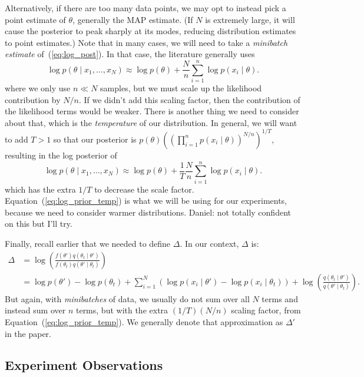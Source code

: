 \documentclass{article}
\begin{document}
Alternatively, if there are too many data points, we may opt to instead pick a point estimate of
$\theta$, generally the MAP estimate. (If $N$ is extremely large, it will cause the posterior to
peak sharply at its modes, reducing distribution estimates to point estimates.) Note that in many
cases, we will need to take a \emph{minibatch estimate} of~(\ref{eq:log_post}). In that case, the
literature generally uses
\begin{equation}\label{eq:scaling_factor}
\log p(\theta \mid x_1,\ldots,x_N) \approx \log p(\theta) + \frac{N}{n} \sum_{i=1}^n\log p(x_i \mid \theta).
\end{equation}
where we only use $n \ll N$ samples, but we must scale up the likelihood contribution by $N/n$. If we
didn't add this scaling factor, then the contribution of the likelihood terms would be weaker. There
is another thing we need to consider about that, which is the \emph{temperature} of our
distribution. In general, we will want to add $T > 1$ so that our posterior is
$p(\theta)((\prod_{i=1}^n p(x_i\mid \theta))^{N/n})^{1/T}$, resulting in the log
posterior of 
\begin{equation}\label{eq:log_prior_temp}
\log p(\theta \mid x_1,\ldots,x_N) \approx \log p(\theta) + \frac{1}{T}\frac{N}{n} \sum_{i=1}^n\log p(x_i \mid \theta).
\end{equation}
which has the extra $1/T$ to decrease the scale factor.  Equation~(\ref{eq:log_prior_temp}) is what
we will be using for our experiments, because we need to consider warmer distributions.
{\color{blue} Daniel: not totally confident on this but I'll try.}

Finally, recall earlier that we needed to define $\Delta$. In our context, $\Delta$ is:
\begin{align}
\Delta &= \log \left(\frac{f(\theta') q(\theta_t \mid \theta')}{f(\theta_t) q(\theta'\mid \theta_t)} \right) \\
&= \log p(\theta') - \log p(\theta_t) + \sum_{i=1}^N(\log p(x_i \mid \theta') - \log p(x_i \mid \theta_t)) + \log\left(\frac{q(\theta_t \mid \theta')}{q(\theta' \mid \theta_t)}\right).
\end{align}
But again, with \emph{minibatches} of data, we usually do not sum over all $N$ terms and instead sum
over $n$ terms, but with the extra $(1/T)(N/n)$ scaling factor, from
Equation~(\ref{eq:log_prior_temp}). We generally denote that approximation as $\Delta'$ in the paper.

\subsection{Experiment Observations}
\end{document}
